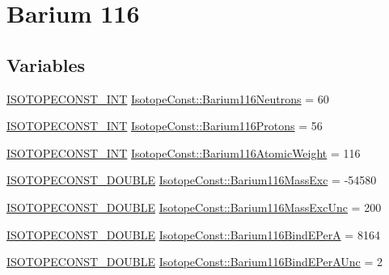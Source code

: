 \hypertarget{group___isotope_const-_barium-_ba116}{}\section{Barium 116}
\label{group___isotope_const-_barium-_ba116}
\subsection*{Variables}
\begin{DoxyCompactItemize}
\item 
\mbox{\hyperlink{group___isotope_const-_macros_ga5f18360b3e99483a35c32d789e62621c}{I\+S\+O\+T\+O\+P\+E\+C\+O\+N\+S\+T\+\_\+\+I\+NT}} \mbox{\hyperlink{group___isotope_const-_barium-_ba116_ga09876f7c9d6902c336ef3e952ef934fb}{Isotope\+Const\+::\+Barium116\+Neutrons}} = 60
\item 
\mbox{\hyperlink{group___isotope_const-_macros_ga5f18360b3e99483a35c32d789e62621c}{I\+S\+O\+T\+O\+P\+E\+C\+O\+N\+S\+T\+\_\+\+I\+NT}} \mbox{\hyperlink{group___isotope_const-_barium-_ba116_ga08dc4d122adeca65d98f51d4103d0cdd}{Isotope\+Const\+::\+Barium116\+Protons}} = 56
\item 
\mbox{\hyperlink{group___isotope_const-_macros_ga5f18360b3e99483a35c32d789e62621c}{I\+S\+O\+T\+O\+P\+E\+C\+O\+N\+S\+T\+\_\+\+I\+NT}} \mbox{\hyperlink{group___isotope_const-_barium-_ba116_ga41a52e25eb30660d7d1438c1d10fe660}{Isotope\+Const\+::\+Barium116\+Atomic\+Weight}} = 116
\item 
\mbox{\hyperlink{group___isotope_const-_macros_ga8f45a7272ce02c0b4c65c44636ed719a}{I\+S\+O\+T\+O\+P\+E\+C\+O\+N\+S\+T\+\_\+\+D\+O\+U\+B\+LE}} \mbox{\hyperlink{group___isotope_const-_barium-_ba116_gaeaeb80d7c0fa4b34e500ce26e0e1adad}{Isotope\+Const\+::\+Barium116\+Mass\+Exc}} = -\/54580
\item 
\mbox{\hyperlink{group___isotope_const-_macros_ga8f45a7272ce02c0b4c65c44636ed719a}{I\+S\+O\+T\+O\+P\+E\+C\+O\+N\+S\+T\+\_\+\+D\+O\+U\+B\+LE}} \mbox{\hyperlink{group___isotope_const-_barium-_ba116_ga5e21e1a6ced6a5356d65ce6f7a7ed823}{Isotope\+Const\+::\+Barium116\+Mass\+Exc\+Unc}} = 200
\item 
\mbox{\hyperlink{group___isotope_const-_macros_ga8f45a7272ce02c0b4c65c44636ed719a}{I\+S\+O\+T\+O\+P\+E\+C\+O\+N\+S\+T\+\_\+\+D\+O\+U\+B\+LE}} \mbox{\hyperlink{group___isotope_const-_barium-_ba116_gac6021136a4481ccaef6eb4630420f0ca}{Isotope\+Const\+::\+Barium116\+Bind\+E\+PerA}} = 8164
\item 
\mbox{\hyperlink{group___isotope_const-_macros_ga8f45a7272ce02c0b4c65c44636ed719a}{I\+S\+O\+T\+O\+P\+E\+C\+O\+N\+S\+T\+\_\+\+D\+O\+U\+B\+LE}} \mbox{\hyperlink{group___isotope_const-_barium-_ba116_ga9cc7d99ede7d1b3cd38470f3d1867b1e}{Isotope\+Const\+::\+Barium116\+Bind\+E\+Per\+A\+Unc}} = 2

\end{DoxyCompactItemize}

